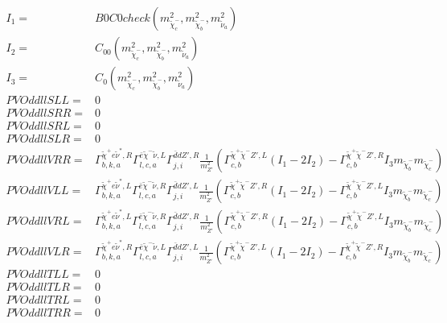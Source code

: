 \documentclass[A4,landscape]{article}
\begin{document}
\begin{align} 
I_1= & B0C0check(m^2_{\tilde{\chi}^-_{{c}}}, m^2_{\tilde{\chi}^-_{{b}}}, m^2_{\tilde{\nu}_{{a}}}) \\ 
I_2= & C_{00}(m^2_{\tilde{\chi}^-_{{c}}}, m^2_{\tilde{\chi}^-_{{b}}}, m^2_{\tilde{\nu}_{{a}}}) \\ 
I_3= & C_0(m^2_{\tilde{\chi}^-_{{c}}}, m^2_{\tilde{\chi}^-_{{b}}}, m^2_{\tilde{\nu}_{{a}}}) \\ 
  PVOddllSLL= & 0 \\ 
  PVOddllSRR= & 0 \\ 
  PVOddllSRL= & 0 \\ 
  PVOddllSLR= & 0 \\ 
  PVOddllVRR= &  \Gamma^{\tilde{\chi}^+e \tilde{\nu}^*,R}_{b, k, a} \Gamma^{\bar{e}\tilde{\chi}^- \tilde{\nu} ,L}_{l, c, a} \Gamma^{\bar{d}d {Z'} ,R}_{j, i} \frac{1}{m^2_{{Z'}}} (\Gamma^{\tilde{\chi}^+\tilde{\chi}^- {Z'} ,L}_{c, b} (I_1 - 2 I_2) - \Gamma^{\tilde{\chi}^+\tilde{\chi}^- {Z'} ,R}_{c, b} I_3 m_{\tilde{\chi}^-_{{b}}} m_{\tilde{\chi}^-_{{c}}}) \\ 
  PVOddllVLL= &  \Gamma^{\tilde{\chi}^+e \tilde{\nu}^*,L}_{b, k, a} \Gamma^{\bar{e}\tilde{\chi}^- \tilde{\nu} ,R}_{l, c, a} \Gamma^{\bar{d}d {Z'} ,L}_{j, i} \frac{1}{m^2_{{Z'}}} (\Gamma^{\tilde{\chi}^+\tilde{\chi}^- {Z'} ,R}_{c, b} (I_1 - 2 I_2) - \Gamma^{\tilde{\chi}^+\tilde{\chi}^- {Z'} ,L}_{c, b} I_3 m_{\tilde{\chi}^-_{{b}}} m_{\tilde{\chi}^-_{{c}}}) \\ 
  PVOddllVRL= &  \Gamma^{\tilde{\chi}^+e \tilde{\nu}^*,L}_{b, k, a} \Gamma^{\bar{e}\tilde{\chi}^- \tilde{\nu} ,R}_{l, c, a} \Gamma^{\bar{d}d {Z'} ,R}_{j, i} \frac{1}{m^2_{{Z'}}} (\Gamma^{\tilde{\chi}^+\tilde{\chi}^- {Z'} ,R}_{c, b} (I_1 - 2 I_2) - \Gamma^{\tilde{\chi}^+\tilde{\chi}^- {Z'} ,L}_{c, b} I_3 m_{\tilde{\chi}^-_{{b}}} m_{\tilde{\chi}^-_{{c}}}) \\ 
  PVOddllVLR= &  \Gamma^{\tilde{\chi}^+e \tilde{\nu}^*,R}_{b, k, a} \Gamma^{\bar{e}\tilde{\chi}^- \tilde{\nu} ,L}_{l, c, a} \Gamma^{\bar{d}d {Z'} ,L}_{j, i} \frac{1}{m^2_{{Z'}}} (\Gamma^{\tilde{\chi}^+\tilde{\chi}^- {Z'} ,L}_{c, b} (I_1 - 2 I_2) - \Gamma^{\tilde{\chi}^+\tilde{\chi}^- {Z'} ,R}_{c, b} I_3 m_{\tilde{\chi}^-_{{b}}} m_{\tilde{\chi}^-_{{c}}}) \\ 
  PVOddllTLL= & 0 \\ 
  PVOddllTLR= & 0 \\ 
  PVOddllTRL= & 0 \\ 
  PVOddllTRR= & 0 \\ 
\end{align} 
\end{document}
